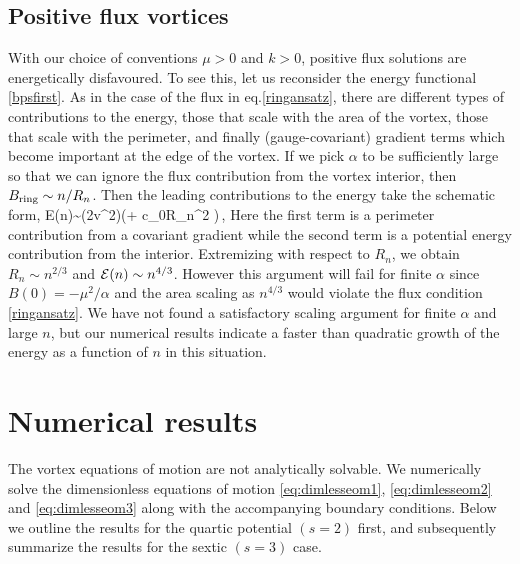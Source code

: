 \subsection{Positive flux vortices}
With our choice of conventions  $\mu >0$ and $k>0$, positive flux solutions are energetically disfavoured. To see this, let us  reconsider the energy functional \eqref{bpsfirst}.  As in the case of the flux in eq.\eqref{ringansatz}, there are different types of contributions to the energy, those that scale with the area of the vortex, those that scale with the perimeter, and finally (gauge-covariant) gradient  terms which become important at the edge of the vortex.
If we pick $\alpha$ to be sufficiently large so that we can ignore the flux contribution from the vortex interior, then 
$B_{\rm ring}\sim n/R_n$. Then the leading contributions to the energy take the schematic form,
\be
{\cal E}(n)\sim (2\pi v^2)\left(\Delta + c_0\pi R_n^2 \right)\,,\qquad \alpha{}
\ee
Here the first term is a perimeter contribution from a covariant gradient while the second term is a potential energy contribution from the interior. Extremizing with respect to $R_n$, we obtain $R_n\sim n^{2/3}$ and ${\cal E}(n)\sim n^{4/3}$.
However this argument will fail for  finite $\alpha$ since $B(0)=-\mu^2/\alpha$ and the area scaling as $n^{4/3}$ would violate  the flux condition \eqref{ringansatz}.  We have not found a satisfactory scaling argument for finite $\alpha$ and large $n$, but our numerical results indicate a faster than quadratic growth of the energy as a function of $n$ in this situation.


%

\section{Numerical results}
The vortex equations of motion are not analytically solvable. We numerically solve the dimensionless equations of motion \eqref{eq:dimlesseom1}, \eqref{eq:dimlesseom2} and \eqref{eq:dimlesseom3} along with the accompanying boundary conditions. Below we outline the results for the quartic potential $(s=2)$ first, and subsequently  summarize the results for the sextic $(s=3)$ case.
